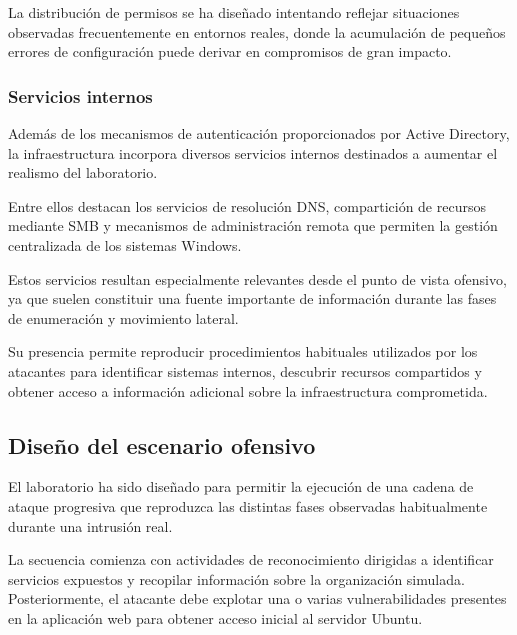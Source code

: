 La distribución de permisos se ha diseñado intentando reflejar situaciones observadas frecuentemente en entornos reales, donde la acumulación de pequeños errores de configuración puede derivar en compromisos de gran impacto.


\subsubsection{Servicios internos}

Además de los mecanismos de autenticación proporcionados por Active Directory, la infraestructura incorpora diversos servicios internos destinados a aumentar el realismo del laboratorio.

Entre ellos destacan los servicios de resolución DNS, compartición de recursos mediante SMB y mecanismos de administración remota que permiten la gestión centralizada de los sistemas Windows.

Estos servicios resultan especialmente relevantes desde el punto de vista ofensivo, ya que suelen constituir una fuente importante de información durante las fases de enumeración y movimiento lateral.

Su presencia permite reproducir procedimientos habituales utilizados por los atacantes para identificar sistemas internos, descubrir recursos compartidos y obtener acceso a información adicional sobre la infraestructura comprometida.

\subsection{Diseño del escenario ofensivo}

El laboratorio ha sido diseñado para permitir la ejecución de una cadena de ataque progresiva que reproduzca las distintas fases observadas habitualmente durante una intrusión real.

La secuencia comienza con actividades de reconocimiento dirigidas a identificar servicios expuestos y recopilar información sobre la organización simulada. Posteriormente, el atacante debe explotar una o varias vulnerabilidades presentes en la aplicación web para obtener acceso inicial al servidor Ubuntu.

